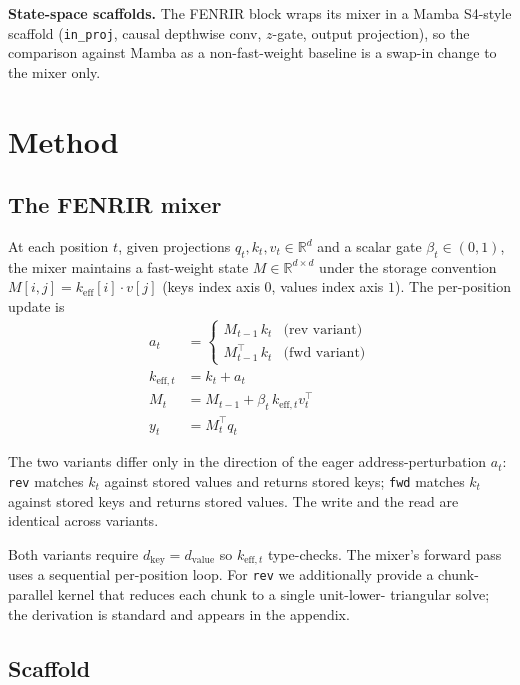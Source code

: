 \documentclass[11pt]{article}
\begin{document}
\textbf{State-space scaffolds.} The FENRIR block wraps its mixer in a
Mamba \citep{gu2023mamba,dao2024mamba2} S4-style scaffold
(\texttt{in\_proj}, causal depthwise conv, $z$-gate, output
projection), so the comparison against Mamba as a non-fast-weight
baseline is a swap-in change to the mixer only.

\section{Method}
\label{sec:method}

\subsection{The FENRIR mixer}
\label{sec:method:mixer}

At each position $t$, given projections $q_t, k_t, v_t \in \mathbb{R}^d$
and a scalar gate $\beta_t \in (0, 1)$, the mixer maintains a
fast-weight state $M \in \mathbb{R}^{d \times d}$ under the storage
convention $M[i, j] = k_{\text{eff}}[i] \cdot v[j]$ (keys index axis
$0$, values index axis $1$). The per-position update is
\begin{align}
a_t &= \begin{cases}
        M_{t-1}\, k_t             & \text{(rev variant)}\\
        M_{t-1}^{\top}\, k_t      & \text{(fwd variant)}
       \end{cases}\\
k_{\text{eff},t} &= k_t + a_t \\
M_t &= M_{t-1} + \beta_t \, k_{\text{eff},t} v_t^{\top} \\
y_t &= M_t^{\top} q_t
\end{align}

The two variants differ only in the direction of the eager
address-perturbation $a_t$: \texttt{rev} matches $k_t$ against stored
values and returns stored keys; \texttt{fwd} matches $k_t$ against
stored keys and returns stored values. The write and the read are
identical across variants.

Both variants require $d_{\text{key}} = d_{\text{value}}$ so
$k_{\text{eff},t}$ type-checks. The mixer's forward pass uses a
sequential per-position loop. For \texttt{rev} we additionally provide a
chunk-parallel kernel that reduces each chunk to a single unit-lower-
triangular solve; the derivation is standard and appears in the
appendix.

\subsection{Scaffold}
\end{document}
